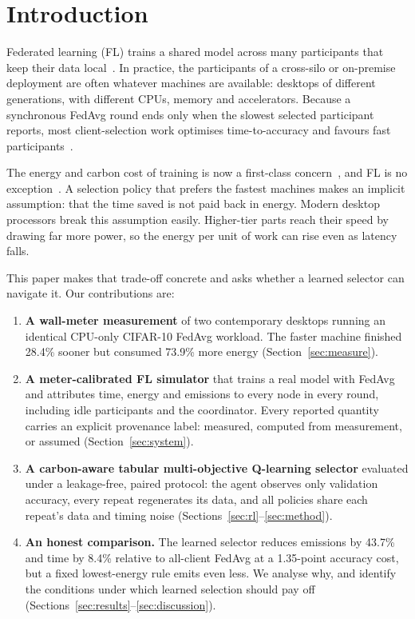 \documentclass[conference]{IEEEtran}
\begin{document}
\section{Introduction}

Federated learning (FL) trains a shared model across many participants that keep their data local~\cite{mcmahan2017fedavg,kairouz2021advances}. In practice, the participants of a cross-silo or on-premise deployment are often whatever machines are available: desktops of different generations, with different CPUs, memory and accelerators. Because a synchronous FedAvg round ends only when the slowest selected participant reports, most client-selection work optimises time-to-accuracy and favours fast participants~\cite{nishio2019client,lai2021oort}.

The energy and carbon cost of training is now a first-class concern~\cite{strubell2019energy,henderson2020systematic,lacoste2019quantifying}, and FL is no exception~\cite{qiu2023carbon}. A selection policy that prefers the fastest machines makes an implicit assumption: that the time saved is not paid back in energy. Modern desktop processors break this assumption easily. Higher-tier parts reach their speed by drawing far more power, so the energy per unit of work can rise even as latency falls.

This paper makes that trade-off concrete and asks whether a learned selector can navigate it. Our contributions are:

\begin{enumerate}
\item \textbf{A wall-meter measurement} of two contemporary desktops running an identical CPU-only CIFAR-10 FedAvg workload. The faster machine finished 28.4\% sooner but consumed 73.9\% more energy (Section~\ref{sec:measure}).
\item \textbf{A meter-calibrated FL simulator} that trains a real model with FedAvg and attributes time, energy and emissions to every node in every round, including idle participants and the coordinator. Every reported quantity carries an explicit provenance label: measured, computed from measurement, or assumed (Section~\ref{sec:system}).
\item \textbf{A carbon-aware tabular multi-objective Q-learning selector} evaluated under a leakage-free, paired protocol: the agent observes only validation accuracy, every repeat regenerates its data, and all policies share each repeat's data and timing noise (Sections~\ref{sec:rl}--\ref{sec:method}).
\item \textbf{An honest comparison.} The learned selector reduces emissions by 43.7\% and time by 8.4\% relative to all-client FedAvg at a 1.35-point accuracy cost, but a fixed lowest-energy rule emits even less. We analyse why, and identify the conditions under which learned selection should pay off (Sections~\ref{sec:results}--\ref{sec:discussion}).
\end{enumerate}
\end{document}
